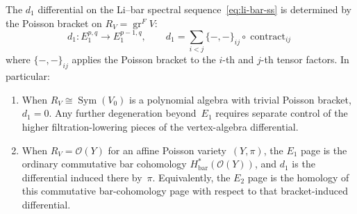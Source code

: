 \begin{proposition}
\label{prop:li-bar-poisson-differential}

The $d_1$ differential on the Li--bar spectral
sequence~\eqref{eq:li-bar-ss} is determined by the Poisson
bracket on $R_V = \operatorname{gr}^F V$:
\[
d_1 \colon E_1^{p,q} \to E_1^{p-1,q},
\qquad
d_1 = \sum_{i < j}
\{-,-\}_{ij} \circ \operatorname{contract}_{ij}
\]
where $\{-,-\}_{ij}$ applies the Poisson bracket to the
$i$-th and $j$-th tensor factors. In particular:
\begin{enumerate}[label=\textup{(\roman*)}]
\item When $R_V \cong \operatorname{Sym}(V_0)$ is a polynomial
 algebra with trivial Poisson bracket, $d_1 = 0$.
 Any further degeneration beyond~$E_1$ requires separate
 control of the higher filtration-lowering pieces of the
 vertex-algebra differential.
\item When $R_V = \mathcal{O}(Y)$ for an affine Poisson
 variety~$(Y, \pi)$, the $E_1$ page is the ordinary
 commutative bar cohomology
 $H^*_{\mathrm{bar}}(\mathcal{O}(Y))$, and $d_1$ is the
 differential induced there by~$\pi$. Equivalently, the
 $E_2$ page is the homology of this commutative
 bar-cohomology page with respect to that bracket-induced
 differential.
\end{enumerate}
\end{proposition}

